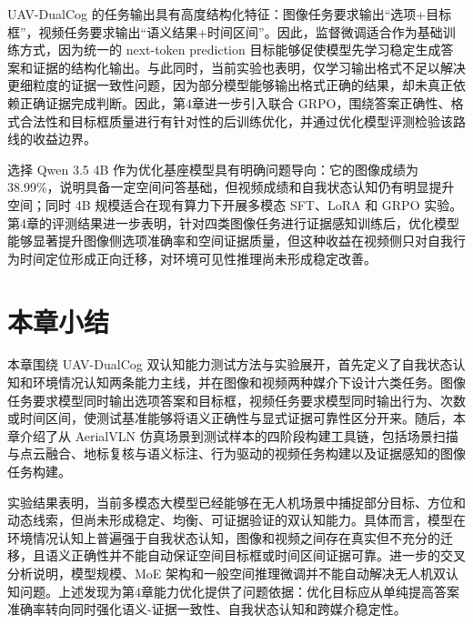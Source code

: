 UAV-DualCog 的任务输出具有高度结构化特征：图像任务要求输出“选项+目标框”，视频任务要求输出“语义结果+时间区间”。因此，监督微调适合作为基础训练方式，因为统一的 next-token prediction 目标能够促使模型先学习稳定生成答案和证据的结构化输出。与此同时，当前实验也表明，仅学习输出格式不足以解决更细粒度的证据一致性问题，因为部分模型能够输出格式正确的结果，却未真正依赖正确证据完成判断。因此，第4章进一步引入联合 GRPO，围绕答案正确性、格式合法性和目标框质量进行有针对性的后训练优化，并通过优化模型评测检验该路线的收益边界。

选择 Qwen 3.5 4B 作为优化基座模型具有明确问题导向：它的图像成绩为 38.99\%，说明具备一定空间问答基础，但视频成绩和自我状态认知仍有明显提升空间；同时 4B 规模适合在现有算力下开展多模态 SFT、LoRA 和 GRPO 实验。第4章的评测结果进一步表明，针对四类图像任务进行证据感知训练后，优化模型能够显著提升图像侧选项准确率和空间证据质量，但这种收益在视频侧只对自我行为时间定位形成正向迁移，对环境可见性推理尚未形成稳定改善。

\section{本章小结}

本章围绕 UAV-DualCog 双认知能力测试方法与实验展开，首先定义了自我状态认知和环境情况认知两条能力主线，并在图像和视频两种媒介下设计六类任务。图像任务要求模型同时输出选项答案和目标框，视频任务要求模型同时输出行为、次数或时间区间，使测试基准能够将语义正确性与显式证据可靠性区分开来。随后，本章介绍了从 AerialVLN 仿真场景到测试样本的四阶段构建工具链，包括场景扫描与点云融合、地标复核与语义标注、行为驱动的视频任务构建以及证据感知的图像任务构建。

实验结果表明，当前多模态大模型已经能够在无人机场景中捕捉部分目标、方位和动态线索，但尚未形成稳定、均衡、可证据验证的双认知能力。具体而言，模型在环境情况认知上普遍强于自我状态认知，图像和视频之间存在真实但不充分的迁移，且语义正确性并不能自动保证空间目标框或时间区间证据可靠。进一步的交叉分析说明，模型规模、MoE 架构和一般空间推理微调并不能自动解决无人机双认知问题。上述发现为第4章能力优化提供了问题依据：优化目标应从单纯提高答案准确率转向同时强化语义-证据一致性、自我状态认知和跨媒介稳定性。
